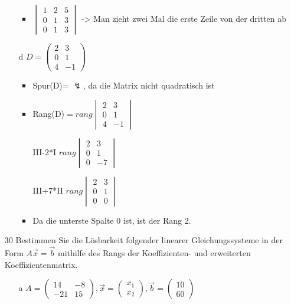 \documentclass{article}
\begin{document}
\begin{itemize}
\begin{itemize}
\begin{itemize}
				\item{$\begin{vmatrix} 1 & 2 & 5 \\ 0 & 1 & 3 \\ 0 & 1 & 3 \end{vmatrix}$ -> Man zieht zwei Mal die erste Zeile von der dritten ab}
			\end{itemize}
			\item[d]{$D=\begin{pmatrix} 2 & 3 \\ 0 & 1 \\ 4 & -1 \end{pmatrix}$}
			\begin{itemize}
				\item{Spur(D)= $\lightning$, da die Matrix nicht quadratisch ist}
				\item{Rang(D)$= rang\begin{vmatrix} 2 & 3 \\ 0 & 1 \\ 4 & -1 \end{vmatrix}$}
				\item[III-2*I]{$rang \begin{vmatrix} 2 & 3 \\ 0 & 1 \\ 0 & -7 \end{vmatrix}$}
				\item[III+7*II]{$rang \begin{vmatrix} 2 & 3 \\ 0 & 1 \\ 0 & 0 \end{vmatrix}$}
				\item{Da die unterste Spalte 0 ist, ist der Rang 2.}
			\end{itemize}
		\end{itemize}
		\item[30]{Bestimmen Sie die Lösbarkeit folgender linearer Gleichungssysteme in der Form $A \vec{x}=\vec{b}$ mithilfe des Rangs der Koeffizienten- und erweiterten Koeffizientenmatrix.}
		\begin{itemize}
			\item[a]{$A=\begin{pmatrix} 14 & -8 \\ -21 & 15 \end{pmatrix}, \vec{x}=\begin{pmatrix} x_1 \\ x_2 \end{pmatrix}, \vec{b}=\begin{pmatrix} 10 \\ 60 \end{pmatrix}$}

\end{itemize}
\end{itemize}
\end{document}

